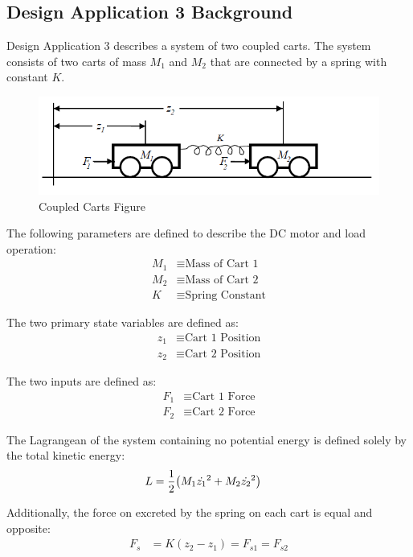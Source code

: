 \documentclass[]{article}
\begin{document}
	\subsection{Design Application 3 Background}
		Design Application 3 describes a system of two coupled carts. The system consists of two carts of mass $M_1$ and $M_2$ that are connected by a spring with constant $K$.
		
		\begin{figure}[h]
			\centering
			\includegraphics[width=0.7\linewidth]{Fig/DesignApplication3}
			\caption{Coupled Carts Figure}
			\label{fig:designapplication3}
		\end{figure}
		
		The following parameters are defined to describe the DC motor and load operation:
		\begin{align*}
			M_1 &\equiv \text{Mass of Cart 1}\\
			M_2 &\equiv \text{Mass of Cart 2}\\
			K &\equiv \text{Spring Constant}
		\end{align*}
		
		The two primary state variables are defined as:
		\begin{align*}
			z_1 &\equiv \text{Cart 1 Position}\\
			z_2 &\equiv \text{Cart 2 Position}
		\end{align*}
		
		The two inputs are defined as:
		\begin{align*}
			F_1 &\equiv \text{Cart 1 Force}\\
			F_2 &\equiv \text{Cart 2 Force}
		\end{align*}
		
		The Lagrangean of the system containing no potential energy is defined solely by the total kinetic energy:
		\begin{align}
			L &= \frac{1}{2} \qty(M_1 \dot{z_1}^2 + M_2 \dot{z_2}^2) \label{eq:carts_lagrange}
		\end{align}
		
		Additionally, the force on excreted by the spring on each cart is equal and opposite:
		\begin{align}
			F_s &= K(z_2 - z_1) = F_{s1} = F_{s2} \label{eq:spring_force}
		\end{align}
		
\end{document}
